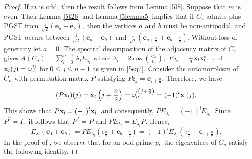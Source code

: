 \documentclass[12pt,a4paper]{article}
\def \e {{\bf e}}
\def \x {{\bf x}}
\def \e {{\mathbf e}}
\newcommand{\ob}[1]{\left(#1\right)}
\begin{document}
\begin{proof}
If $m$ is odd, then the result follows from Lemma \ref{5l8}. Suppose that $m$ is even. Then Lemma \ref{5t26}
 and Lemma \ref{5lemma5} implies that if $C_n$ admits plus PGST from $\frac{1}{\sqrt{2}}\ob{\e_a+\e_b},$ then the vertices $a$ and $b$ must be non-antipodal, and PGST occurs between $\frac{1}{\sqrt{2}}\ob{\e_a+\e_b}$ and $\frac{1}{\sqrt{2}}\ob{\e_{a+\frac{n}{2}}+\e_{b+\frac{n}{2}}}.$ 
 Without loss of generaity let $a=0.$ The spectral decomposition of the adjacency matrix of $C_n$ gives $A(C_n)=\sum_{l=0}^{n-1}\lambda_l E_{\lambda_l}$  where $\lambda_l=2\cos{(\frac{2l\pi}{n})},$ $E_{\lambda_l}=\frac{1}{n}\x_l\x_l^*,$ and $\x_l(j)=\omega_n^{lj}$ for $0\leq j\leq n-1$ as given in \eqref{5eq7}. Consider the automorphism of $C_n$ with permutation matrix $P$ satisfying $P\e_j=\e_{j+\frac{n}{2}}.$
  Therefore, we have
  \[(P\x_l)(j)=\x_l\ob{j+\frac{n}{2}}=\omega_n^{l\ob{j+\frac{n}{2}}}=(-1)^l\x_l(j).\]
  This shows that $P\x_l=(-1)^l \x_l,$ and consequently, $PE_{\lambda_l}=(-1)^lE_{\lambda_l}.$
    Since $P^2=I,$ it follows that $P^T=P$ and $PE_{\lambda_l}=E_{\lambda_l}P.$ Hence,
    \begin{equation}\label{5eq22}
        E_{\lambda_l}\ob{\e_0+\e_b}=PE_{\lambda_l}\ob{e_{\frac{n}{2}}+\e_{b+\frac{n}{2}}}=(-1)^lE_{\lambda_l}\ob{e_{\frac{n}{2}}+\e_{b+\frac{n}{2}}}.
         \end{equation}
In the proof of \cite[Lemma 11]{pal4}, we observe that for an odd prime $p,$ the eigenvalues of $C_n$ satisfy the following identity.
         

\end{proof}
\end{document}
